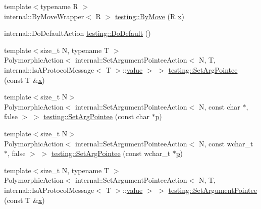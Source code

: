 \begin{DoxyCompactItemize}
\item 
{\footnotesize template$<$typename R $>$ }\\internal\+::\+By\+Move\+Wrapper$<$ R $>$ \mbox{\hyperlink{namespacetesting_a38293837852ef2c406b063741018d108}{testing\+::\+By\+Move}} (R \mbox{\hyperlink{_obj__test_2lib_2googletest-master_2googlemock_2test_2gmock-matchers__test_8cc_a6150e0515f7202e2fb518f7206ed97dc}{x}})
\item 
internal\+::\+Do\+Default\+Action \mbox{\hyperlink{namespacetesting_ae041df61ff61ccb9753ba15b4309e1a6}{testing\+::\+Do\+Default}} ()
\item 
{\footnotesize template$<$size\+\_\+t N, typename T $>$ }\\Polymorphic\+Action$<$ internal\+::\+Set\+Argument\+Pointee\+Action$<$ N, T, internal\+::\+Is\+A\+Protocol\+Message$<$ T $>$\+::\mbox{\hyperlink{_obj__test_2lib_2googletest-master_2googlemock_2test_2gmock-matchers__test_8cc_a337b8a670efc0b086ad3af163f3121b6}{value}} $>$ $>$ \mbox{\hyperlink{namespacetesting_a5740a5033b88c37666fcd09a269d123f}{testing\+::\+Set\+Arg\+Pointee}} (const T \&\mbox{\hyperlink{_obj__test_2lib_2googletest-master_2googlemock_2test_2gmock-matchers__test_8cc_a6150e0515f7202e2fb518f7206ed97dc}{x}})
\item 
{\footnotesize template$<$size\+\_\+t N$>$ }\\Polymorphic\+Action$<$ internal\+::\+Set\+Argument\+Pointee\+Action$<$ N, const char $\ast$, false $>$ $>$ \mbox{\hyperlink{namespacetesting_a4a190fd2d02fb7cd79c5b3df3f80b647}{testing\+::\+Set\+Arg\+Pointee}} (const char $\ast$\mbox{\hyperlink{_obj__test_2lib_2googletest-master_2googlemock_2test_2gmock-matchers__test_8cc_a6bc6b007533335efe02bafff799ec64c}{p}})
\item 
{\footnotesize template$<$size\+\_\+t N$>$ }\\Polymorphic\+Action$<$ internal\+::\+Set\+Argument\+Pointee\+Action$<$ N, const wchar\+\_\+t $\ast$, false $>$ $>$ \mbox{\hyperlink{namespacetesting_ac128085b4a8d64563fd5ccef324ea177}{testing\+::\+Set\+Arg\+Pointee}} (const wchar\+\_\+t $\ast$\mbox{\hyperlink{_obj__test_2lib_2googletest-master_2googlemock_2test_2gmock-matchers__test_8cc_a6bc6b007533335efe02bafff799ec64c}{p}})
\item 
{\footnotesize template$<$size\+\_\+t N, typename T $>$ }\\Polymorphic\+Action$<$ internal\+::\+Set\+Argument\+Pointee\+Action$<$ N, T, internal\+::\+Is\+A\+Protocol\+Message$<$ T $>$\+::\mbox{\hyperlink{_obj__test_2lib_2googletest-master_2googlemock_2test_2gmock-matchers__test_8cc_a337b8a670efc0b086ad3af163f3121b6}{value}} $>$ $>$ \mbox{\hyperlink{namespacetesting_a03b315d27c91a8e719f2b6c09964130b}{testing\+::\+Set\+Argument\+Pointee}} (const T \&\mbox{\hyperlink{_obj__test_2lib_2googletest-master_2googlemock_2test_2gmock-matchers__test_8cc_a6150e0515f7202e2fb518f7206ed97dc}{x}})

\end{DoxyCompactItemize}
